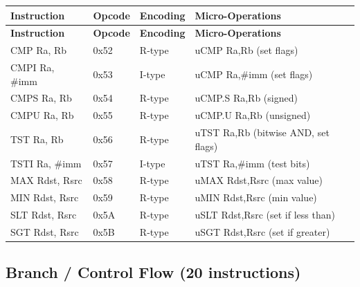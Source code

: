 \documentclass[12pt]{article}
\begin{document}
\begin{longtable}{@{}L{2.8cm}L{1.5cm}L{1.7cm}L{4.8cm}@{}}
\toprule
\textbf{Instruction} & \textbf{Opcode} & \textbf{Encoding} & \textbf{Micro-Operations} \\ \midrule
\endfirsthead
\toprule
\textbf{Instruction} & \textbf{Opcode} & \textbf{Encoding} & \textbf{Micro-Operations} \\ \midrule
\endhead
CMP Ra, Rb & 0x52 & R-type & uCMP Ra,Rb (set flags) \\
CMPI Ra, \#imm & 0x53 & I-type & uCMP Ra,\#imm (set flags) \\
CMPS Ra, Rb & 0x54 & R-type & uCMP.S Ra,Rb (signed) \\
CMPU Ra, Rb & 0x55 & R-type & uCMP.U Ra,Rb (unsigned) \\
TST Ra, Rb & 0x56 & R-type & uTST Ra,Rb (bitwise AND, set flags) \\
TSTI Ra, \#imm & 0x57 & I-type & uTST Ra,\#imm (test bits) \\
MAX Rdst, Rsrc & 0x58 & R-type & uMAX Rdst,Rsrc (max value) \\
MIN Rdst, Rsrc & 0x59 & R-type & uMIN Rdst,Rsrc (min value) \\
SLT Rdst, Rsrc & 0x5A & R-type & uSLT Rdst,Rsrc (set if less than) \\
SGT Rdst, Rsrc & 0x5B & R-type & uSGT Rdst,Rsrc (set if greater) \\ \bottomrule
\end{longtable}

\subsection{Branch / Control Flow (20 instructions)}
\end{document}
